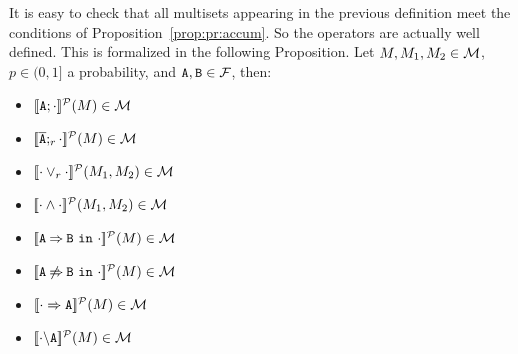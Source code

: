 

It is easy to check that all multisets appearing in the previous
definition meet the conditions of Proposition~\ref{prop:pr:accum}. So
the operators are actually well defined. This is formalized in the
following Proposition.
\bprop\label{prp:domain:prob}
  Let  $M,M_{1}, M_{2}\in{\cal M}$,
  $p\in(0,1]$ a probability, and 
  $\mathtt{A},\mathtt{B}\in{\cal F}$, then:
  \begin{itemize}
  \item $[\![\mathtt{A};\cdot]\!]^{\cal P}(M)\in{\cal M}$
  \item $[\![\overline{\mathtt{A}};_{r}\cdot]\!]^{\cal P}(M)\in{\cal M}$
  \item $[\![\cdot\mathbin{\lor}_{r}\cdot]\!]^{\cal P}(M_{1},M_{2})\in{\cal M}$
  \item $[\![\cdot\mathbin{\wedge}\cdot]\!]^{\cal P}(M_{1},M_{2})\in{\cal M}$
  \item $[\![\mathtt{A}\mathbin{\Rightarrow}\mathtt{B}\ \mathtt{in}\ \cdot]\!]^{\cal P}(M)\in{\cal M}$
  \item $[\![\mathtt{A}\mathbin{\not\Rightarrow}\mathtt{B}\ \mathtt{in}\ \cdot]\!]^{\cal P}(M)\in{\cal M}$
  \item $[\![\cdot\Rightarrow\mathtt{A}]\!]^{\cal P}(M)\in{\cal M}$
  \item $[\![\cdot\backslash\mathtt{A}]\!]^{\cal P}(M)\in{\cal M}$
  \end{itemize}
\eprop





